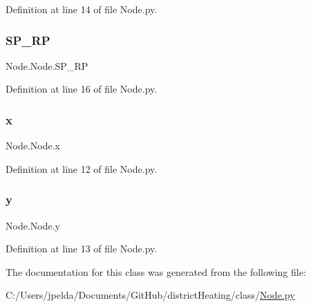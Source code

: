 Definition at line 14 of file Node.\+py.

\mbox{\label{class_node_1_1_node_a036a86db86d1899d2dff6915f6092328}} 
\subsubsection{\texorpdfstring{S\+P\+\_\+\+RP}{SP\_RP}}
{\footnotesize\ttfamily Node.\+Node.\+S\+P\+\_\+\+RP}



Definition at line 16 of file Node.\+py.

\mbox{\label{class_node_1_1_node_a6bfcdef2c07be856e8850fcbdbb82025}} 
\subsubsection{\texorpdfstring{x}{x}}
{\footnotesize\ttfamily Node.\+Node.\+x}



Definition at line 12 of file Node.\+py.

\mbox{\label{class_node_1_1_node_aab9b32354c529afe23970aeda52308b9}} 
\subsubsection{\texorpdfstring{y}{y}}
{\footnotesize\ttfamily Node.\+Node.\+y}



Definition at line 13 of file Node.\+py.



The documentation for this class was generated from the following file\+:\begin{DoxyCompactItemize}
\item 
C\+:/\+Users/jpelda/\+Documents/\+Git\+Hub/district\+Heating/class/\hyperlink{_node_8py}{Node.\+py}\end{DoxyCompactItemize}
